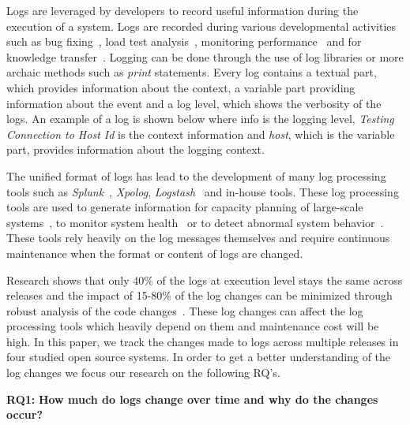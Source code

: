 Logs are leveraged by developers to record useful information during the execution of a system. Logs are recorded during various developmental activities such as bug fixing~\cite{ConsoleLogs,JGLouMining,QFuanomaly}, load test analysis~\cite{Automatic}, monitoring performance~\cite{Yuan} and for knowledge transfer~\cite{IanWCRE}.
Logging can be done through the use of log libraries or more archaic methods such as \textsl{print} statements. Every log contains a textual part, which provides information about the context, a variable part providing information about the event and a log level, which shows the verbosity of the logs. An example of a log is shown below where info is the logging level, \textsl{Testing Connection to Host Id} is the context information and \textsl{host}, which is the variable part, provides information about the logging context.

The unified format of logs has lead to the development of many log processing tools such as \textsl{Splunk}~\cite{carasso2012exploring}, \textsl{Xpolog}, \textsl{Logstash}~\cite{xu2013detecting} and in-house tools. These log processing tools are used to generate information for capacity planning of large-scale systems~\cite{hassan2008industrial,nagappan2009efficiently}, to monitor system health~\cite{bitincka2010optimizing} or to detect abnormal system behavior~\cite{JiangICSM2008}. These tools rely heavily on the log messages themselves and require continuous maintenance when the format or content of logs are changed. 


Research shows that only 40\% of the logs at execution level stays the same across releases and the impact of 15-80\% of the log changes can be minimized through robust analysis of the code changes~\cite{IanWCRE}. These log changes can affect the log processing tools which heavily depend on them and maintenance cost will be high. In this paper, we track the changes made to logs across multiple releases in four studied open source systems. In order to get a better understanding of the log changes we focus our research on the following RQ's.


\textbf{RQ1:} \textbf{How much do logs change over time and why do the changes occur?}

